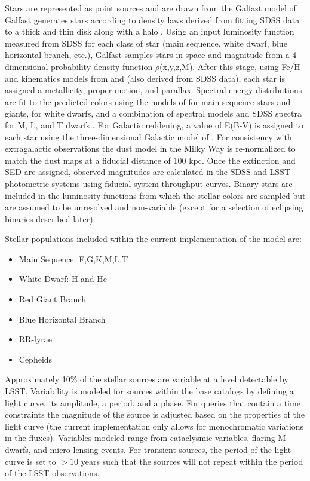 \documentclass[]{article}
\begin{document}
Stars are represented as point sources and are drawn from the Galfast model of \citep{galfast}.  
Galfast generates stars according to
density laws  derived from fitting SDSS data
to a thick and thin disk along with a halo \citep{juric}. Using an 
input luminosity function measured from SDSS for each class of star 
(main sequence, white dwarf, blue horizontal branch, etc.), Galfast samples stars in space and magnitude 
from a 4-dimensional probability density function
$\rho$(x,y,z,M). After this stage, using Fe/H and kinematics models
from \citet{ivezic08} and \citet{bond09} (also derived from SDSS data), 
each star is assigned a metallicity, proper motion, and parallax.
Spectral energy distributions are fit to the predicted
colors using the models of \citet{kuruczCD} for main sequence
stars and giants, \citet{bergeron95} for white dwarfs,
and a combination of spectral models and SDSS spectra for M, L, and T
dwarfs 
\citep[e.g.][]{cushing05,bochanski07,burrows06,pettersen89,kowalski10}. 
For Galactic reddening, a value of E(B-V) is assigned to each
star using the three-dimensional Galactic model of 
\citet{amores05}. For consistency with extragalactic observations the
dust model in the Milky Way is re-normalized to match the 
\citet{schlegel98} dust maps at a fiducial distance of 100 kpc.  Once the 
extinction and SED are assigned, observed magnitudes are calculated in
the SDSS and LSST photometric systems using fiducial system throughput curves.
Binary stars are included in the luminosity functions from which the
stellar colors are sampled but are assumed to be unresolved and
non-variable (except for a selection of eclipsing binaries described
later).

Stellar  populations included within the current implementation of the model are:
\begin{itemize}
\item Main Sequence: F,G,K,M,L,T
\item White Dwarf: H and He
\item Red Giant Branch
\item Blue Horizontal Branch
\item RR-lyrae
\item Cepheids
\end{itemize}

Approximately 10\% of the stellar sources are variable at a level detectable
by LSST.
Variability is modeled for sources within the base catalogs
by defining a light curve, its amplitude, a period, and a phase. For
queries that contain a time constraints the magnitude of the source is
adjusted based on the properties of the light curve (the current
implementation only allows for monochromatic variations in the
fluxes). Variables modeled range from cataclysmic variables, flaring
M-dwarfs, and micro-lensing events. For transient sources, the period
of the light curve is set to $>10$ years such that the sources will
not repeat within the period of the LSST observations.
\end{document}
